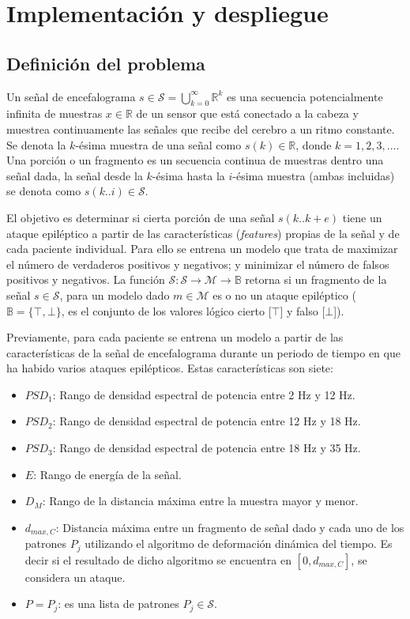 \chapter{Implementación y despliegue}\label{chap:implementation}
\section{Definición del problema}
Un señal de encefalograma $s\in\mathcal{S}=\bigcup_{k=0}^\infty \mathbb{R}^k$
es una secuencia potencialmente infinita de muestras $x\in\mathbb{R}$ de un
sensor que está conectado a la cabeza y muestrea continuamente las señales que
recibe del cerebro a un ritmo constante. Se denota la $k$-ésima muestra de una
señal como $s (k)\in\mathbb{R}$, donde $k=1,2,3,...$. Una porción o un
fragmento es un secuencia continua de muestras dentro una señal dada, la señal
desde la $k$-ésima hasta la $i$-ésima muestra (ambas incluidas) se denota como
$s (k .. i)\in\mathcal{S}$.

El objetivo es determinar si cierta porción de una señal $s(k..k+e)$ tiene un
ataque epiléptico a partir de las características (\textit{features}) propias
de la señal y de cada paciente individual. Para ello se entrena un modelo que
trata de maximizar el número de verdaderos positivos y negativos; y minimizar
el número de falsos positivos y negativos. La función
$\mathscr{S}: \mathcal{S} \rightarrow \mathcal{M} \rightarrow \mathbb{B}$
retorna si un fragmento de la señal $s\in\mathcal{S}$, para un modelo dado
$m\in\mathcal{M}$ es o no un ataque epiléptico ($\mathbb{B}=\{\top, \bot\}$, es
el conjunto de los valores lógico cierto [$\top$] y falso [$\bot$]).

Previamente, para cada paciente se entrena un modelo a partir de las
características de la señal de encefalograma durante un periodo de tiempo en
que ha habido varios ataques epilépticos. Estas características son siete:

\begin{itemize}
    \item $PSD_1$: Rango de densidad espectral de potencia entre 2 Hz y 12 Hz.
    \item $PSD_2$: Rango de densidad espectral de potencia entre 12 Hz y 18 Hz.
    \item $PSD_3$: Rango de densidad espectral de potencia entre 18 Hz y 35 Hz.
    \item $E$: Rango de energía de la señal.
    \item $D_M$: Rango de la distancia máxima entre la muestra mayor y menor.
    \item $d_{max,C}$: Distancia máxima entre un fragmento de señal dado y cada
        uno de los patrones $P_j$ utilizando el algoritmo de deformación
        dinámica del tiempo. Es decir si el resultado de dicho algoritmo se
        encuentra en $[0, d_{max,C}]$, se considera un ataque.
    \item $P=P_j$: es una lista de patrones $P_j\in\mathcal{S}$.
\end{itemize}

